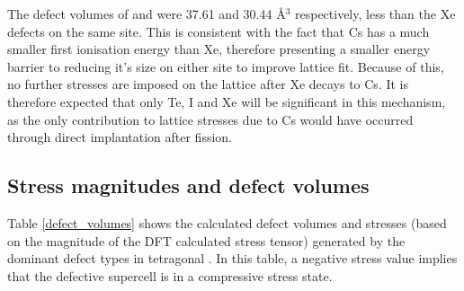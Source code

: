 The defect volumes of  and  were 37.61 and 30.44 \r{A}$^{3}$ respectively, less than the Xe defects on the same site. This is consistent with the fact that Cs has a much smaller first ionisation energy than Xe, therefore presenting a smaller energy barrier to reducing it's size on either site to improve lattice fit. Because of this, no further stresses are imposed on the lattice after Xe decays to Cs. It is therefore expected that only Te, I and Xe will be significant in this mechanism, as the only contribution to lattice stresses due to Cs would have occurred through direct implantation after fission. 

\subsection{Stress magnitudes and defect volumes}

Table \ref{defect_volumes} shows the calculated defect volumes and stresses (based on the magnitude of the DFT calculated stress tensor) generated by the dominant defect types in tetragonal \zirconia . In this table, a negative stress value implies that the defective supercell is in a compressive stress state.

